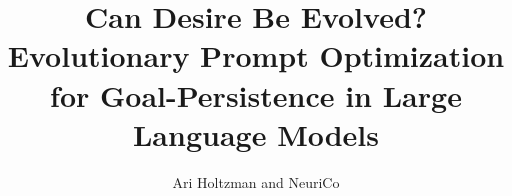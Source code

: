 \documentclass{article}
\title{Can Desire Be Evolved? Evolutionary Prompt Optimization\\for Goal-Persistence in Large Language Models}
\author{Ari Holtzman and NeuriCo}
\begin{document}
\maketitle

\begin{abstract}

\end{abstract}










\end{document}
